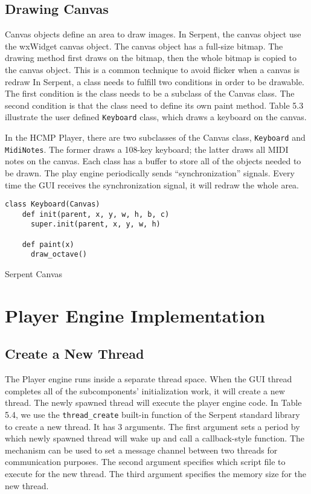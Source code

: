 \subsection{Drawing Canvas}
 
Canvas objects define an area to draw images. In Serpent, the canvas 
object use the wxWidget canvas object. The canvas object has a full-size bitmap.
The drawing method first draws on the bitmap, then the whole bitmap is copied 
to the canvas object. This is a common technique to avoid flicker when a canvas is 
redraw In Serpent, a class needs to fulfill two conditions in order 
to be drawable. The first condition is
the class needs to be a subclass of the Canvas class. The second condition is that 
the class need to define its own paint method. Table 5.3 illustrate the user 
defined \texttt{Keyboard} class, which draws a keyboard on the canvas.

In the HCMP Player, there are two subclasses of the Canvas class, 
\texttt{Keyboard} and \texttt{MidiNotes}. The former draws a 108-key 
keyboard; the latter draws all MIDI notes on the canvas. Each class has a buffer 
to store all of the objects needed to be drawn. The play engine periodically 
sends ``synchronization'' signals. Every time the GUI receives the synchronization 
signal, it will redraw the whole area.

\begin{table}[htdp]
\centering

\begin{lstlisting}
class Keyboard(Canvas)
    def init(parent, x, y, w, h, b, c)
      super.init(parent, x, y, w, h)

    def paint(x)
      draw_octave()
\end{lstlisting}
\caption[Serpent Canvas]{Serpent Canvas}
\end{table}

\section{Player Engine Implementation}

\subsection{Create a New Thread}
The Player engine runs inside a separate thread space. When the GUI thread completes 
all of the subcomponents' initialization work, it will create a new thread. The newly
spawned thread will execute the player engine code. In Table 5.4, we use the   
\texttt{thread\_create} built-in function of the Serpent standard library to create 
a new thread. It has 3 arguments. 
The first argument sets a period by which newly spawned thread will wake up and call 
a callback-style function. The mechanism can be used to set a message channel between 
two threads for communication purposes. The second argument specifies 
which script file to execute for the new thread. The third argument specifies the 
memory size for the new thread.

